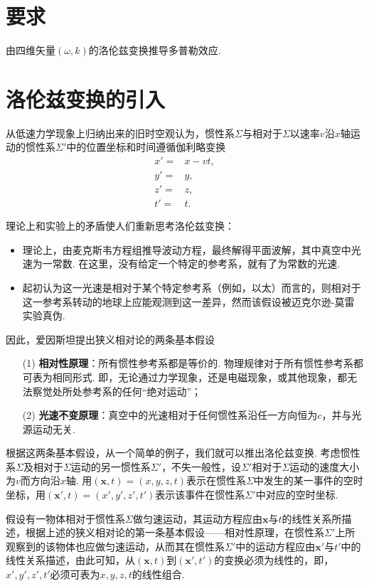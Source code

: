 \documentclass{assignment}
\begin{document}
\section*{要求}
由四维矢量$(\omega,k)$的洛伦兹变换推导多普勒效应.

\section{洛伦兹变换的引入}
从低速力学现象上归纳出来的旧时空观认为，惯性系$\Sigma$与相对于$\Sigma$以速率$v$沿$x$轴运动的惯性系$\Sigma'$中的位置坐标和时间遵循伽利略变换
\begin{align}
    x'=&x-vt,\\
    y'=&y,\\
    z'=&z,\\
    t'=&t.
\end{align}

理论上和实验上的矛盾使人们重新思考洛伦兹变换：
\begin{itemize}
    \item 理论上，由麦克斯韦方程组推导波动方程，最终解得平面波解，其中真空中光速为一常数. 在这里，没有给定一个特定的参考系，就有了为常数的光速.
    \item 起初认为这一光速是相对于某个特定参考系（例如，以太）而言的，则相对于这一参考系转动的地球上应能观测到这一差异，然而该假设被迈克尔逊-莫雷实验真伪.
\end{itemize}

因此，爱因斯坦提出狭义相对论的两条基本假设
\begin{itemize}
    \item[(1)] \textbf{相对性原理}：所有惯性参考系都是等价的. 物理规律对于所有惯性参考系都可表为相同形式. 即，无论通过力学现象，还是电磁现象，或其他现象，都无法察觉处所处参考系的任何“绝对运动”；
    \item[(2)] \textbf{光速不变原理}：真空中的光速相对于任何惯性系沿任一方向恒为$c$，并与光源运动无关.
\end{itemize}

根据这两条基本假设，从一个简单的例子，我们就可以推出洛伦兹变换. 考虑惯性系$\Sigma$及相对于$\Sigma$运动的另一惯性系$\Sigma'$，不失一般性，设$\Sigma'$相对于$\Sigma$运动的速度大小为$v$而方向沿$x$轴. 用$(\bm{x},t)=(x,y,z,t)$表示在惯性系$\Sigma$中发生的某一事件的空时坐标，用$(\bm{x}',t)=(x',y',z',t')$表示该事件在惯性系$\Sigma'$中对应的空时坐标.

假设有一物体相对于惯性系$\Sigma$做匀速运动，其运动方程应由$\bm{x}$与$t$的线性关系所描述，根据上述的狭义相对论的第一条基本假设——相对性原理，在惯性系$\Sigma'$上所观察到的该物体也应做匀速运动，从而其在惯性系$\Sigma'$中的运动方程应由$\bm{x}'$与$t'$中的线性关系描述，由此可知，从$(\bm{x},t)$到$(\bm{x}',t')$的变换必须为线性的，即，$x',y',z',t'$必须可表为$x,y,z,t$的线性组合.
\end{document}
